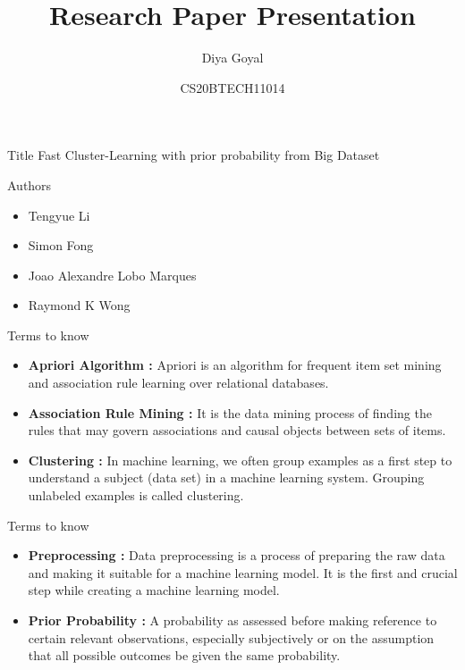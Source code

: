 \documentclass{beamer}
\title{Research Paper Presentation}
\author{Diya Goyal}
\date{CS20BTECH11014}
\begin{document}
\begin{frame}
\titlepage
\end{frame}
\begin{frame}
\begin{block} {Title}
Fast Cluster-Learning with prior probability from Big Dataset
\end{block}
\begin{block} {Authors}
\begin{itemize}
    \item Tengyue Li
    \item Simon Fong
    \item Joao Alexandre Lobo Marques
    \item Raymond K Wong
\end{itemize}
\end{block}
\end{frame}
\begin{frame}{Terms to know}
\begin{itemize}
    \item \textbf{Apriori Algorithm : }Apriori is an algorithm for frequent item set mining and association rule learning over relational databases.
\item \textbf{Association Rule Mining : }It is the data mining process of finding the rules that may govern associations and causal objects between sets of items.
\item \textbf{Clustering : }In machine learning, we often group examples as a first step to understand a subject (data set) in a machine learning system. Grouping unlabeled examples is called clustering.
\end{itemize}
\end{frame}
\begin{frame}{Terms to know}
\begin{itemize}
    \item \textbf{Preprocessing : }Data preprocessing is a process of preparing the raw data and making it suitable for a machine learning model. It is the first and crucial step while creating a machine learning model.
\item \textbf{Prior Probability : }A probability as assessed before making reference to certain relevant observations, especially subjectively or on the assumption that all possible outcomes be given the same probability.
\end{itemize}
\end{frame}
\end{document}
